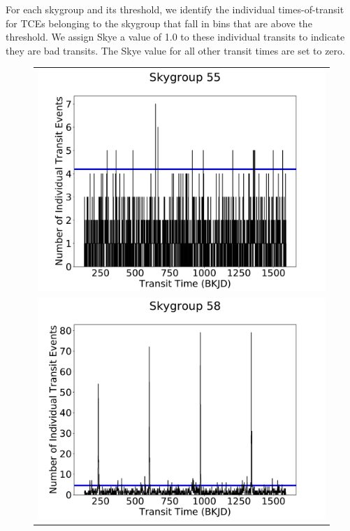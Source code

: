 For each skygroup and its threshold, we identify the individual times-of-transit for TCEs belonging to the skygroup that fall in bins that are above the threshold. We assign Skye a value of 1.0 to these individual transits to indicate they are bad transits. The Skye value for all other transit times are set to zero.

\begin{figure}[ht]
\centering
\begin{tabular}{c}
\includegraphics[width=\linewidth]{Skye-Paper-Plot-55.pdf}\\
\includegraphics[width=\linewidth]{Skye-Paper-Plot-58.pdf}
\end{tabular}

\end{figure}
